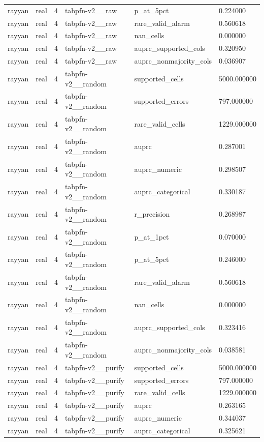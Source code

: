 \begin{tabular}{llllll}
rayyan & real & 4 & tabpfn-v2\_\_raw & p\_at\_5pct & 0.224000 \\
rayyan & real & 4 & tabpfn-v2\_\_raw & rare\_valid\_alarm & 0.560618 \\
rayyan & real & 4 & tabpfn-v2\_\_raw & nan\_cells & 0.000000 \\
rayyan & real & 4 & tabpfn-v2\_\_raw & auprc\_supported\_cols & 0.320950 \\
rayyan & real & 4 & tabpfn-v2\_\_raw & auprc\_nonmajority\_cols & 0.036907 \\
rayyan & real & 4 & tabpfn-v2\_\_random & supported\_cells & 5000.000000 \\
rayyan & real & 4 & tabpfn-v2\_\_random & supported\_errors & 797.000000 \\
rayyan & real & 4 & tabpfn-v2\_\_random & rare\_valid\_cells & 1229.000000 \\
rayyan & real & 4 & tabpfn-v2\_\_random & auprc & 0.287001 \\
rayyan & real & 4 & tabpfn-v2\_\_random & auprc\_numeric & 0.298507 \\
rayyan & real & 4 & tabpfn-v2\_\_random & auprc\_categorical & 0.330187 \\
rayyan & real & 4 & tabpfn-v2\_\_random & r\_precision & 0.268987 \\
rayyan & real & 4 & tabpfn-v2\_\_random & p\_at\_1pct & 0.070000 \\
rayyan & real & 4 & tabpfn-v2\_\_random & p\_at\_5pct & 0.246000 \\
rayyan & real & 4 & tabpfn-v2\_\_random & rare\_valid\_alarm & 0.560618 \\
rayyan & real & 4 & tabpfn-v2\_\_random & nan\_cells & 0.000000 \\
rayyan & real & 4 & tabpfn-v2\_\_random & auprc\_supported\_cols & 0.323416 \\
rayyan & real & 4 & tabpfn-v2\_\_random & auprc\_nonmajority\_cols & 0.038581 \\
rayyan & real & 4 & tabpfn-v2\_\_purify & supported\_cells & 5000.000000 \\
rayyan & real & 4 & tabpfn-v2\_\_purify & supported\_errors & 797.000000 \\
rayyan & real & 4 & tabpfn-v2\_\_purify & rare\_valid\_cells & 1229.000000 \\
rayyan & real & 4 & tabpfn-v2\_\_purify & auprc & 0.263165 \\
rayyan & real & 4 & tabpfn-v2\_\_purify & auprc\_numeric & 0.344037 \\
rayyan & real & 4 & tabpfn-v2\_\_purify & auprc\_categorical & 0.325621 \\

\end{tabular}
